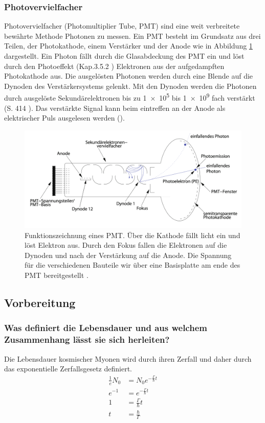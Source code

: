 \subsubsection{Photovervielfacher}
\label{sec:pmt}
Photovervielfacher (Photomultiplier Tube, PMT) sind eine weit verbreitete bewährte Methode Photonen zu messen.
Ein PMT besteht im Grundsatz aus drei Teilen, der Photokathode, einem Verstärker und der Anode wie in Abbildung \ref{fig:pmt} dargestellt.
Ein Photon fällt durch die Glasabdeckung des PMT ein und löst durch den Photoeffekt (Kap.3.5.2 \cite{source2}) Elektronen aus der aufgedampften Photokathode aus.
Die ausgelösten Photonen werden durch eine Blende auf die Dynoden des Verstärkersystems gelenkt.
Mit den Dynoden werden die Photonen durch ausgelöste Sekundärelektronen bis zu \num{1e5} bis \num{1e9} fach verstärkt (S. \num{414} \cite{source2}).
Das verstärkte Signal kann beim eintreffen an der Anode als elektrischer Puls ausgelesen werden (\cite{source2}).
\begin{figure}[ht]
    \centering
    \includegraphics[width = \textwidth]{./bilder/PMT.png}
    \caption{Funktionszeichnung eines PMT. Über die Kathode fällt licht ein und löst Elektron aus. Durch den Fokus fallen die Elektronen auf die Dynoden und nach der Verstärkung auf die Anode. Die Spannung für die verschiedenen Bauteile wir über eine Basisplatte am ende des PMT bereitgestellt \cite{Schmidt2002Aufbau}.}
    \label{fig:pmt}
\end{figure}

\subsection{Vorbereitung}
\subsubsection{Was definiert die Lebensdauer und aus welchem Zusammenhang lässt sie sich herleiten?}
Die Lebensdauer kosmischer Myonen wird durch ihren Zerfall und daher durch das exponentielle Zerfallsgesetz definiert.
\begin{align*}
    \frac{1}{e} N_0 &= N_0 e^{-\frac{\Gamma}{\hbar} t}\\
    e^{-1} &= e^{-\frac{\Gamma}{\hbar} t}\\
    1 &= \frac{\Gamma}{\hbar} t \\
    t &= \frac{\hbar}{\Gamma}
\end{align*}
